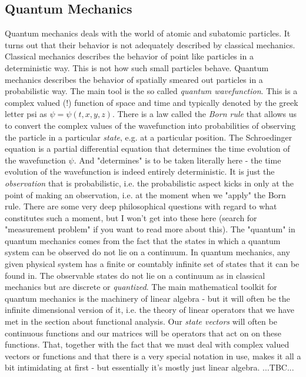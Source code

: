 

\subsection{Quantum Mechanics}
Quantum mechanics deals with the world of atomic and subatomic particles. It turns out that their behavior is not adequately described by classical mechanics. Classical mechanics describes the behavior of point like particles in a deterministic way. This is not how such small particles behave. Quantum mechanics describes the behavior of spatially smeared out particles in a probabilistic way. The main tool is the so called \emph{quantum wavefunction}. This is a complex valued (!) function of space and time and typically denoted by the greek letter psi as $\psi = \psi(t,x,y,z)$. There is a law called the \emph{Born rule} that allows us to convert the complex values of the wavefunction into probabilities of observing the particle in a particular \emph{state}, e.g. at a particular position. The Schroedinger equation is a partial differential equation that determines the time evolution of the wavefunction $\psi$. And "determines" is to be taken literally here - the time evolution of the wavefunction is indeed entirely deterministic. It is just the \emph{observation} that is probabilistic, i.e. the probabilistic aspect kicks in only at the point of making an observation, i.e. at the moment when we "apply" the Born rule. There are some very deep philosophical questions with regard to what constitutes such a moment, but I won't get into these here (search for "measurement problem" if you want to read more about this). The "quantum" in quantum mechanics comes from the fact that the states in which a quantum system can be observed do not lie on a continuum. In quantum mechanics, any given physical system has a finite or countably infinite set of states that it can be found in. The observable states do not lie on a continuum as in classical mechanics but are discrete or \emph{quantized}. The main mathematical toolkit for quantum mechanics is the machinery of linear algebra - but it will often be the infinite dimensional version of it, i.e. the theory of linear operators that we have met in the section about functional analysis. Our \emph{state vectors} will often be continuous functions and our matrices will be operators that act on on these functions. That, together with the fact that we must deal with complex valued vectors or functions and that there is a very special notation in use, makes it all a bit intimidating at first - but essentially it's mostly just linear algebra.
...TBC...

